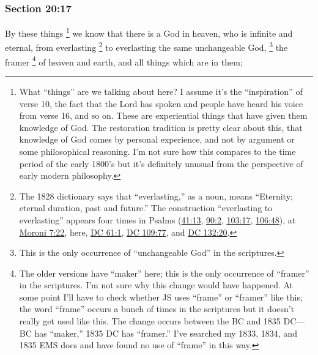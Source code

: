 	\subsubsection{Section 20:17} %
		\label{DC20-17}

		By these things%
			\footnote{%
				What ``things'' are we talking about here? I assume it's the ``inspiration'' of verse 10, the fact that the Lord has spoken and people have heard his voice from verse 16, and so on. These are experiential things that have given them knowledge of God. The restoration tradition is pretty clear about this, that knowledge of God comes by personal experience, and not by argument or some philosophical reasoning. I'm not sure how this compares to the time period of the early 1800's but it's definitely unusual from the perspective of early modern philosophy.
				}
		we know that there is a God in heaven, who is infinite and eternal, from everlasting%
			\footnote{%
				The 1828 dictionary says that ``everlasting,'' as a noun, means ``Eternity; eternal duration, past and future.'' The construction ``everlasting to everlasting'' appears four times in Psalms (\hyperref[PSALMS-41-13]{41:13}, \hyperref[PSALMS-90-2]{90:2}, \hyperref[PSALMS-103-17]{103:17}, \hyperref[PSALMS-106-48]{106:48}), at \hyperref[MORONI-7-22]{Moroni 7:22}, here, \hyperref[DC61-1]{DC 61:1}, \hyperref[DC109-77]{DC 109:77}, and \hyperref[DC132-20]{DC 132:20}.
				}
		to everlasting the same unchangeable God,%
			\footnote{%
				This is the only occurrence of ``unchangeable God'' in the scriptures.
				}
		the framer%
			\footnote{%
				The older versions have ``maker'' here; this is the only occurrence of ``framer'' in the scriptures. I'm not sure why this change would have happened. At some point I'll have to check whether JS uses ``frame'' or ``framer'' like this; the word ``frame'' occurs a bunch of times in the scriptures but it doesn't really get used like this. The change occurs between the BC and 1835 DC---BC has ``maker,'' 1835 DC has ``framer.'' I've searched my 1833, 1834, and 1835 EMS docs and have found no use of ``frame'' in this way.
				}
		of heaven and earth, and all things which are in them;

